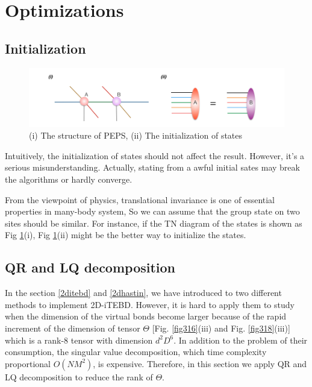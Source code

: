 \section{Optimizations}
\label{2dopt}
\subsection{Initialization}
\label{2doptInit}
\begin{figure}[ht]
	\centering
	\includegraphics[width=1.00\textwidth]{figures/fig321.png}
	\caption[The diagrams of initializing projected entangled pair states]{(i) The structure of PEPS, (ii) The initialization of states}
	\label{fig321}
\end{figure}

Intuitively, the initialization of states should not affect the result. However, it's a serious misunderstanding. Actually, stating from a awful initial sates may break the algorithms or hardly converge.

From the viewpoint of physics, translational invariance is one of essential properties in many-body system, So we can assume that the group state on two sites should be similar. For instance, if the TN diagram of the states is shown as Fig \ref{fig321}(i), Fig \ref{fig321}(ii) might be the better way to initialize the states.

\subsection{QR and LQ decomposition}
\label{2doptQR} 
In the section \ref{2ditebd} and \ref{2dhastin}, we have introduced to two different methods to implement 2D-iTEBD. However, it is hard to apply them to study when the dimension of the virtual bonds become larger because of the rapid increment of the dimension of tensor $\Theta$ [Fig. \ref{fig316}(iii) and Fig. \ref{fig318}(iii)] which is a rank-8 tensor with dimension $d^2D^6$. In addition to the problem of their consumption, the singular value decomposition, which time complexity proportional $O(NM^2)$, is expensive.  Therefore, in this section we apply QR and LQ decomposition to reduce the rank of $\Theta$.

